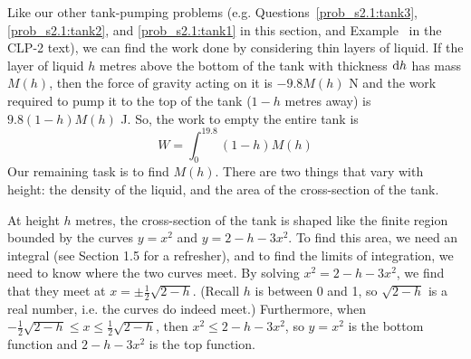 \begin{solution}
Like our other tank-pumping problems (e.g. Questions~\ref{prob_s2.1:tank3}, \ref{prob_s2.1:tank2}, and \ref{prob_s2.1:tank1} in this section, and Example~ in the CLP-2 text), we can find the work done by considering thin layers of liquid. If the layer of liquid $h$ metres above the bottom of the tank with thickness $\mathrm{d}h$ has mass $M(h)$, then the force of gravity acting on it is $-9.8M(h)$ N and the work required to pump it to the top of the tank ($1-h$ metres away) is $9.8(1-h)M(h)$ J. So, the work to empty the entire tank is
\[W = \int_0^19.8(1-h)M(h) \tag{$*$} \]
Our  remaining task is to find $M(h)$. There are two things that vary with height: the density of the liquid, and the area of the cross-section of the tank.

At  height $h$ metres, the cross-section of the tank is shaped like the finite region bounded by the curves $y=x^2$ and $y=2-h-3x^2$. To find this area, we need an integral (see Section 1.5 for a refresher), and to find the limits of integration, we need to know where the two curves meet. By solving $x^2 =2-h-3x^2$, we find that they meet at $x = \pm\frac{1}{2}\sqrt{2-h}$. (Recall $h$ is between 0 and 1, so $\sqrt{2-h}$ is a real number, i.e. the curves do indeed meet.) Furthermore, when $-\frac{1}{2}\sqrt{2-h}\le x \le \frac{1}{2}\sqrt{2-h}$, then $x^2 \leq 2-h-3x^2$, so $y=x^2$ is the bottom function and $2-h-3x^2$ is the top function.

\begin{center}
\end{center}


\end{solution}
